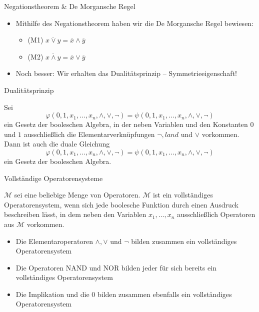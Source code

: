 \documentclass[12pt%
,aspectratio=169%
]{beamer}
\begin{document}
\begin{frame}{Negationstheorem \& De Morgansche Regel}
\begin{itemize}
	\item Mithilfe des Negationstheorem haben wir die De Morgansche Regel bewiesen:
	\begin{itemize}
		\item (M1) $\overline{x \lor y} = \overline{x} \land \overline{y}$
		\item (M2) $\overline{x \land y} = \overline{x} \lor \overline{y}$
	\end{itemize}
	\item Noch besser: Wir erhalten das Dualitätsprinzip -- Symmetrieeigenschaft!
\end{itemize}
\end{frame}

\begin{frame}{Dualitätsprinzip}
\begin{theorem}
Sei
$$
\varphi(0, 1, x_1 , \ldots, x_n , \land, \lor, \neg) = \psi(0, 1, x_1 , \ldots, x_n , \land, \lor, \neg)
$$
ein Gesetz der booleschen Algebra, in der neben Variablen und den Konstanten $0$ und $1$ ausschließlich die Elementarverknüpfungen $\neg, land$ und $\lor$ vorkommen. Dann ist auch die duale Gleichung
$$
\varphi(0, 1, x_1 , \ldots, x_n , \land, \lor, \neg) = \psi(0, 1, x_1 , \ldots, x_n , \land, \lor, \neg)
$$
ein Gesetz der booleschen Algebra.
\end{theorem}
\end{frame}


\begin{frame}{Vollständige Operatorensysteme}
\begin{definition}
$\mathcal{M}$ sei eine beliebige Menge von Operatoren. $\mathcal{M}$ ist ein vollständiges Operatorensystem, wenn sich jede boolesche Funktion durch einen Ausdruck beschreiben lässt, in dem neben den Variablen $x_1 , \ldots , x_n$ ausschließlich Operatoren aus $\mathcal{M}$ vorkommen.
\end{definition}
\begin{itemize}
	\item Die Elementaroperatoren $\land, \lor$ und $\neg$ bilden zusammen ein vollständiges Operatorensystem
	\item Die Operatoren NAND und NOR bilden jeder für sich bereits ein vollständiges Operatorensystem
	\item Die Implikation und die $0$ bilden zusammen ebenfalls ein vollständiges Operatorensystem
\end{itemize}
\end{frame}
\end{document}
